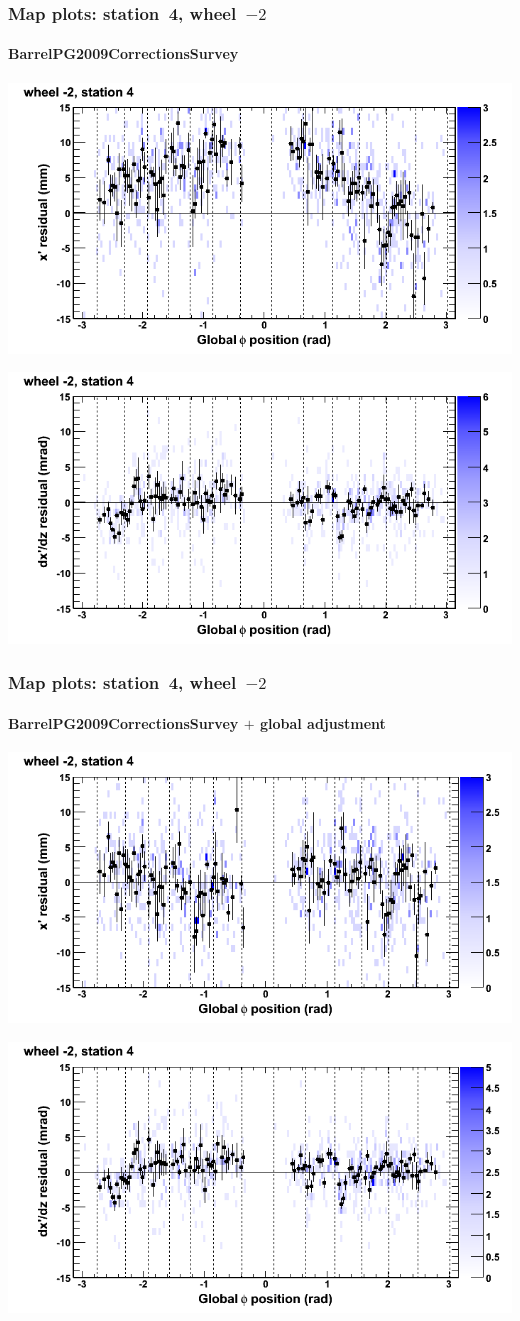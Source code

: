 \documentclass[compress]{beamer}
\begin{document}
\begin{frame}
\frametitle{Map plots: station~4, wheel~$-2$}
\framesubtitle{BarrelPG2009CorrectionsSurvey}
\includegraphics[width=0.5\linewidth]{mapplots_01/DTvsphi_st4whA_x.png}

\includegraphics[width=0.5\linewidth]{mapplots_01/DTvsphi_st4whA_dxdz.png}
\end{frame}
\begin{frame}
\frametitle{Map plots: station~4, wheel~$-2$}
\framesubtitle{BarrelPG2009CorrectionsSurvey $+$ global adjustment}
\includegraphics[width=0.5\linewidth]{mapplots_re01/DTvsphi_st4whA_x.png}

\includegraphics[width=0.5\linewidth]{mapplots_re01/DTvsphi_st4whA_dxdz.png}
\end{frame}
\end{document}
